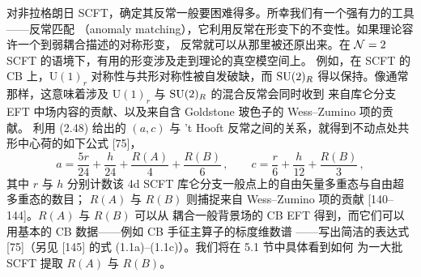 对非拉格朗日 SCFT，确定其反常一般要困难得多。所幸我们有一个强有力的工具——反常匹配
（anomaly matching），它利用反常在形变下的不变性。如果理论容许一个到弱耦合描述的对称形变，
反常就可以从那里被还原出来。在 $\mathcal{N}=2$ SCFT 的语境下，有用的形变涉及走到理论的真空模空间上。
例如，在 SCFT 的 CB 上，$\mathrm{U}(1)_r$ 对称性与共形对称性被自发破缺，而 $\mathrm{SU}(2)_R$
得以保持。像通常那样，这意味着涉及 $\mathrm{U}(1)_r$ 与 $\mathrm{SU}(2)_R$ 的混合反常会同时收到
来自库仑分支 EFT 中场内容的贡献、以及来自含 Goldstone 玻色子的 Wess--Zumino 项的贡献。
利用 (2.48) 给出的 $(a,c)$ 与 't Hooft 反常之间的关系，就得到不动点处共形中心荷的如下公式 [75]，
\begin{equation}
  a=\frac{5r}{24}+\frac{h}{24}+\frac{R(A)}{4}+\frac{R(B)}{6}\,,\qquad
  c=\frac{r}{6}+\frac{h}{12}+\frac{R(B)}{3}\,,
  \tag{2.50}
\end{equation}
其中 $r$ 与 $h$ 分别计数该 4d SCFT 库仑分支一般点上的自由矢量多重态与自由超多重态的数目；
$R(A)$ 与 $R(B)$ 则捕捉来自 Wess--Zumino 项的贡献 [140--144]。$R(A)$ 与 $R(B)$ 可以从
耦合一般背景场的 CB EFT 得到，而它们可以用基本的 CB 数据——例如 CB 手征主算子的标度维数谱
——写出简洁的表达式 [75]（另见 [145] 的式 (1.1a)--(1.1c)）。我们将在 5.1 节中具体看到如何
为一大批 SCFT 提取 $R(A)$ 与 $R(B)$。


